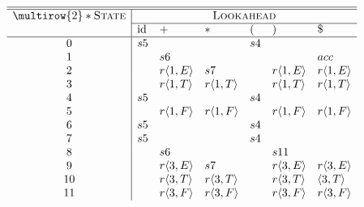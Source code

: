 \centering
\small
$\begin{array}{c|llllll}
\hline\hline
\multirow{2}*{\textsc{State}} & \multicolumn{6}{c}{\textsc{Lookahead}} \\\cline{2-7}
                             & \text{id} & + & * & ( & ) & \$\\
\hline
0  & s5 &    &    & s4 &    &  \\
1  &    & s6 &    &    &    & acc           \\
2  &    & r \langle 1, E \rangle & s7 &    & r \langle 1, E \rangle & r \langle 1, E \rangle  \\
3  &    & r \langle 1, T \rangle & r \langle 1, T \rangle &    & r \langle 1, T \rangle & r \langle 1, T \rangle \\
4  & s5 &    &    & s4 &    &  \\
5  &    & r \langle 1, F \rangle & r \langle 1, F \rangle &    & r \langle 1, F \rangle & r \langle 1, F \rangle \\
6  & s5 &    &    & s4 &    &  \\
7  & s5 &    &    & s4 &    &  \\
8  &    & s6 &    &    & s11&  \\
9  &    & r \langle 3, E \rangle & s7 &    & r \langle 3, E \rangle & r \langle 3, E \rangle \\
10 &    & r \langle 3, T \rangle & r \langle 3, T \rangle &    & r \langle 3, T \rangle & \langle 3, T \rangle  \\
11 &    & r \langle 3, F \rangle & r \langle 3, F \rangle &    & r \langle 3, F \rangle & r \langle 3, F \rangle
\end{array}$